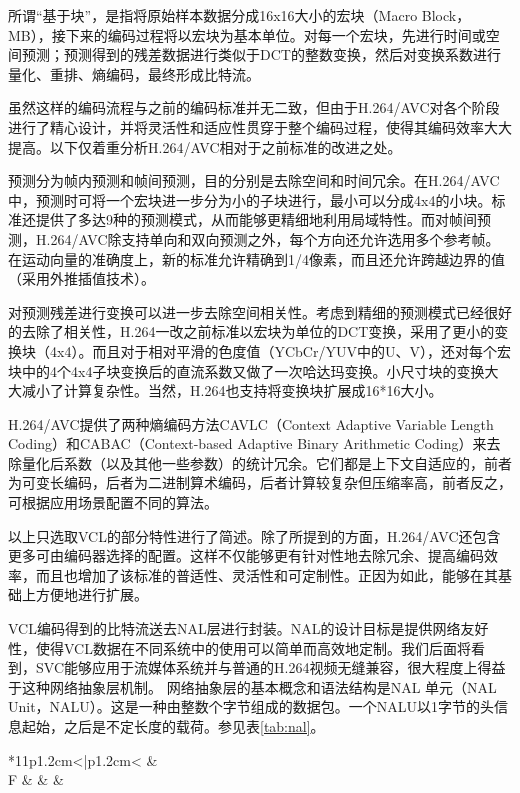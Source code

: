 所谓“基于块”，是指将原始样本数据分成16x16大小的宏块（Macro Block，MB），接下来的编码过程将以宏块为基本单位。对每一个宏块，先进行时间或空间预测；预测得到的残差数据进行类似于DCT的整数变换，然后对变换系数进行量化、重排、熵编码，最终形成比特流。

虽然这样的编码流程与之前的编码标准并无二致，但由于H.264/AVC对各个阶段进行了精心设计，并将灵活性和适应性贯穿于整个编码过程，使得其编码效率大大提高。以下仅着重分析H.264/AVC相对于之前标准的改进之处。

预测分为帧内预测和帧间预测，目的分别是去除空间和时间冗余。在H.264/AVC中，预测时可将一个宏块进一步分为小的子块进行，最小可以分成4x4的小块。标准还提供了多达9种的预测模式，从而能够更精细地利用局域特性。而对帧间预测，H.264/AVC除支持单向和双向预测之外，每个方向还允许选用多个参考帧。在运动向量的准确度上，新的标准允许精确到1/4像素，而且还允许跨越边界的值（采用外推插值技术）。

对预测残差进行变换可以进一步去除空间相关性。考虑到精细的预测模式已经很好的去除了相关性，H.264一改之前标准以宏块为单位的DCT变换，采用了更小的变换块（4x4）。而且对于相对平滑的色度值（YCbCr/YUV中的U、V），还对每个宏块中的4个4x4子块变换后的直流系数又做了一次哈达玛变换。小尺寸块的变换大大减小了计算复杂性。当然，H.264也支持将变换块扩展成16*16大小。

H.264/AVC提供了两种熵编码方法CAVLC（Context Adaptive Variable Length Coding）和CABAC（Context-based Adaptive Binary Arithmetic Coding）来去除量化后系数（以及其他一些参数）的统计冗余。它们都是上下文自适应的，前者为可变长编码，后者为二进制算术编码，后者计算较复杂但压缩率高，前者反之，可根据应用场景配置不同的算法。

以上只选取VCL的部分特性进行了简述。除了所提到的方面，H.264/AVC还包含更多可由编码器选择的配置。这样不仅能够更有针对性地去除冗余、提高编码效率，而且也增加了该标准的普适性、灵活性和可定制性。正因为如此，能够在其基础上方便地进行扩展。

VCL编码得到的比特流送去NAL层进行封装。NAL的设计目标是提供网络友好性，使得VCL数据在不同系统中的使用可以简单而高效地定制。我们后面将看到，SVC能够应用于流媒体系统并与普通的H.264视频无缝兼容，很大程度上得益于这种网络抽象层机制。
网络抽象层的基本概念和语法结构是NAL 单元（NAL Unit，NALU）。这是一种由整数个字节组成的数据包。一个NALU以1字节的头信息起始，之后是不定长度的载荷。参见表\ref{tab:nal}。

\begin{table}[h]
\centering
\caption{H.264/AVC中的NAL单元结构}
\label{tab:nal}
\begin{tabular}{*{11}{p{1.2cm}<{\centering}|}{p{1.2cm}<{\centering}}}
	\hline
	 &  \\ \hline
	F &  &  &  \\ \hline
\end{tabular}
\end{table}

